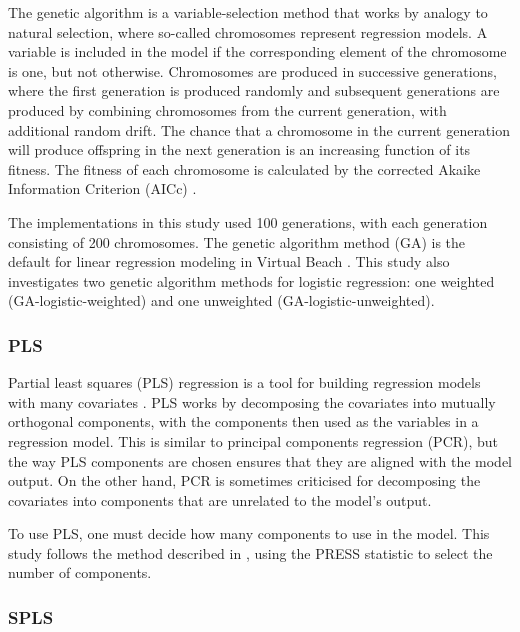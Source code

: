 \documentclass{article}\usepackage[]{graphicx}\usepackage[]{color}
\numberwithin{equation}{section}
\numberwithin{figure}{section}
\renewcommand\[{\begin{equation}}
\renewcommand\]{\end{equation}}
\begin{document}
The genetic algorithm \citep{Fogel-1998} is a variable-selection
method that works by analogy to natural selection, where so-called
chromosomes represent regression models. A variable is included in
the model if the corresponding element of the chromosome is one, but
not otherwise. Chromosomes are produced in successive generations,
where the first generation is produced randomly and subsequent generations
are produced by combining chromosomes from the current generation,
with additional random drift. The chance that a chromosome in the
current generation will produce offspring in the next generation is
an increasing function of its fitness. The fitness of each chromosome
is calculated by the corrected Akaike Information Criterion (AICc)
\citet{Akaike-1973,Hurvich-Tsai-1989}.

The implementations in this study used 100 generations, with each
generation consisting of 200 chromosomes. The genetic algorithm method
(GA) is the default for linear regression modeling in Virtual Beach
\citep{Cyterski-Brooks-Galvin-Wolfe-Carvin-Roddick-Fienen-Corsi-2013}.
This study also investigates two genetic algorithm methods for logistic
regression: one weighted (GA-logistic-weighted) and one unweighted
(GA-logistic-unweighted).


\subsubsection{PLS}

Partial least squares (PLS) regression is a tool for building regression
models with many covariates \citep{Wold-Sjostrum-Eriksson-2001}.
PLS works by decomposing the covariates into mutually orthogonal components,
with the components then used as the variables in a regression model.
This is similar to principal components regression (PCR), but the
way PLS components are chosen ensures that they are aligned with the
model output. On the other hand, PCR is sometimes criticised for decomposing
the covariates into components that are unrelated to the model's output.

To use PLS, one must decide how many components to use in the model.
This study follows the method described in \citet{Brooks-Fienen-Corsi-2013},
using the PRESS statistic to select the number of components.


\subsubsection{SPLS}
\end{document}

